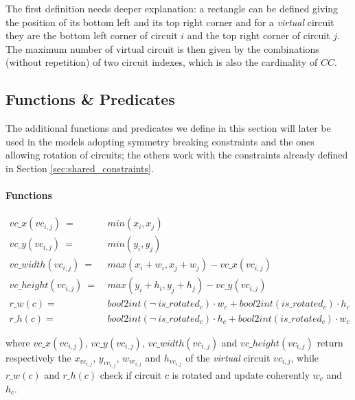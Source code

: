 The first definition needs deeper explanation: a rectangle can be defined giving the position
of its bottom left and its top right corner and for a \textit{virtual} circuit they are the
bottom left corner of circuit $i$ and the top right corner of circuit $j$.
The maximum number of virtual circuit is then given by the combinations (without repetition)
of two circuit indexes, which is also the cardinality of $CC$.




\subsection{Functions \& Predicates} \label{sec:CP_functions_predicates}
The additional functions and predicates we define in this section will later be used in the models
adopting symmetry breaking constraints and the ones allowing rotation of circuits; the others work
with the constraints already defined in Section \ref{sec:shared_constraints}.

\paragraph{Functions}
\begin{align}
  vc\_x(vc_{i,j})\        =\  & min(x_i, x_j)                                                     \nonumber \\
  vc\_y(vc_{i,j})\        =\  & min(y_i, y_j)                                                     \nonumber \\
  vc\_width(vc_{i,j})\    =\  & max(x_i + w_i, x_j + w_j) - vc\_x(vc_{i,j})                       \nonumber \\
  vc\_height(vc_{i,j})\   =\  & max(y_i + h_i, y_j + h_j) - vc\_y(vc_{i,j})                       \nonumber \\
  r\_w(c) =\                  & bool2int(\neg\ is\_rotated_c) \cdot w_c + bool2int(is\_rotated_c) \cdot h_c
  \label{eq:CP_r_w}                                                                                         \\
  r\_h(c) =\                  & bool2int(\neg\ is\_rotated_c) \cdot h_c + bool2int(is\_rotated_c) \cdot w_c
  \label{eq:CP_r_h}
\end{align}

where $vc\_x(vc_{i,j})$, $vc\_y(vc_{i,j})$, $vc\_width(vc_{i,j})$ and $vc\_height(vc_{i,j})$
return respectively the $x_{vc_{i,j}}$, $y_{vc_{i,j}}$, $w_{vc_{i,j}}$ and $h_{vc_{i,j}}$ of 
the \textit{virtual} circuit $vc_{i,j}$, while $r\_w(c)$ and $r\_h(c)$ check if circuit $c$ 
is rotated and update coherently $w_c$ and $h_c$.

